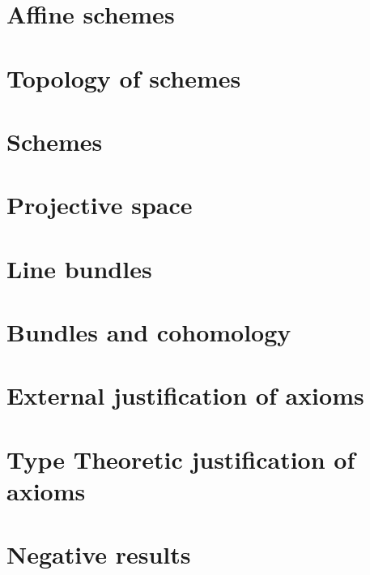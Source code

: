 \documentclass{../util/zariski}
\begin{document}
\section{Affine schemes}


\section{Topology of schemes}
\label{topology-of-schemes}


\section{Schemes}


\section{Projective space}


\section{Line bundles}


\section{Bundles and cohomology}


\section{External justification of axioms}


\section{Type Theoretic justification of axioms}


\appendix

\section{Negative results}


\printindex

\printbibliography
\end{document}

